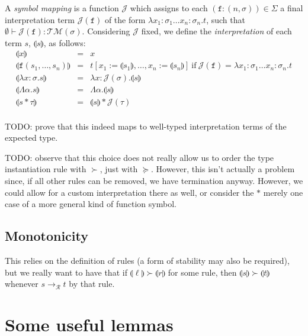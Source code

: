 \documentclass[runningheads,a4paper]{llncs}
\newcommand{\Rules}{\mathcal{R}}
\newcommand{\Typemap}{\mathcal{T\!M}}
\newcommand{\Termmap}{\mathcal{J}}
\newcommand{\interpret}[1]{\llparenthesis #1 \rrparenthesis}
\newcommand{\arr}[1]{\to_{#1}}
\newcommand{\abs}[2]{\lambda #1.#2}
\newcommand{\tabs}[2]{\Lambda #1.#2}
\newcommand{\tapp}[2]{#1 * #2}
\begin{document}
\begin{definition}
A \emph{symbol mapping} is a function $\Termmap$ which assigns to each
$(\mathtt{f}:(n,\sigma)) \in \Sigma$ a final interpretation term
$\Termmap(\mathtt{f})$ of the form $\abs{x_1:\sigma_1 \dots x_n:
\sigma_n}{t}$, such that $\emptyset \vdash \Termmap(\mathtt{f}) :
\Typemap(\sigma)$.  Considering $\Termmap$ fixed, we define the
\emph{interpretation} of each term $s$, $\interpret{s}$, as follows:
\[
\begin{array}{rcl}
\interpret{x} & = & x \\
\interpret{\mathtt{f}(s_1,\dots,s_n)} & = &
  t[x_1:=\interpret{s_1},\dots,x_n:=\interpret{s_n}]\ \text{if}\ 
  \Termmap(\mathtt{f}) = \abs{x_1:\sigma_1 \dots x_n:\sigma_n}{t} \\
\interpret{\abs{x:\sigma}{s}} & = & \abs{x:\Termmap(\sigma)}{
  \interpret{s}} \\
\interpret{\tabs{\alpha}{s}} & = & \tabs{\alpha}{\interpret{s}} \\
\interpret{\tapp{s}{\tau}} & = & \tapp{\interpret{s}}{\Termmap(\tau)} \\
\end{array}
\]
\end{definition}

TODO: prove that this indeed maps to well-typed interpretation terms of
the expected type.

TODO: observe that this choice does not really allow us to order the
type instantiation rule with $\succ$, just with $\succeq$.  However, this
isn't actually a problem since, if all other rules can be removed, we have
termination anyway.  However, we could allow for a custom interpretation
there as well, or consider the $*$ merely one case of a more general kind
of function symbol.

\subsection{Monotonicity}

This relies on the definition of rules (a form of stability may also be
required), but we really want to have that if $\interpret{\ell} \succ
\interpret{r}$ for some rule, then $\interpret{s} \succ \interpret{t}$
whenever $s \arr{\Rules} t$ by that rule.

\section{Some useful lemmas}
\end{document}

